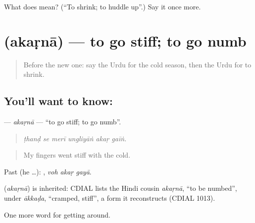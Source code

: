 \begin{tcolorbox}[breakable,colback=teal!4,colframe=teal!35!black,title={Before you move on}]
What does  mean? (\textquotedblleft{}To shrink; to huddle up\textquotedblright{}.) Say it once more.
\end{tcolorbox}
\section[\texorpdfstring{\ur{اکڑنا} (akaṛnā)}{اکڑنا (akaṛnā)}]{ (akaṛnā) — to go stiff; to go numb}

\label{lesson:UR-C429-akarna}



\begin{quote}
Before the new one: say the Urdu for the cold season, then the Urdu for to shrink.
\end{quote}

\subsection*{You'll want to know: }
\textbf{} — \emph{akaṛnā} — \textquotedblleft{}to go stiff; to go numb\textquotedblright{}.

\begin{quote}
     
\end{quote}

\begin{quote}
\emph{ṭhanḍ se merī ungliyāṅ akaṛ gaīṅ.}
\end{quote}

\begin{quote}
My fingers went stiff with the cold.
\end{quote}

Past (he …):   , \emph{voh akaṛ gayā}.

\begin{cousinweb}
\textbf{} (\emph{akaṛnā}) is inherited: CDIAL lists the Hindi cousin \emph{akaṛnā}, \textquotedblleft{}to be numbed\textquotedblright{}, under \emph{ākkaḍa}, \textquotedblleft{}cramped, stiff\textquotedblright{}, a form it reconstructs (CDIAL 1013).
\end{cousinweb}

\begin{grammarlens}[title={What you've built}]
One more word for getting around.
\end{grammarlens}

